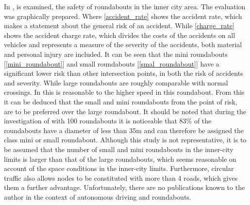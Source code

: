 In \cite{Baumert1998, brilon2002verkehrssicherheit, brilon2004uberprufung,voss1994verkehrssicherheit}, is examined, the safety of roundabouts in the inner city area.
The evaluation was graphically prepared. Where \cref{accident_rate} shows the accident rate, which makes a statement about the general risk of an accident.
While \cref{charge_rate} shows the accident charge rate, which divides the costs of the accidents on all vehicles and represents a measure of the severity of the accidents,
both material and personal injury are included. It can be seen that the mini roundabouts [\cref{mini_roundabout}] and small roundabouts [\cref{smal_roundabout}] have a significant 
lower risk than other intersection points, in both the risk of accidents and severity. While large roundabouts are roughly comparable with normal crossings. 
In \cite{Bondzio2012} this is reasonable to the higher speed in this roundabout. From this it can be deduced that the small and mini roundabouts from the point of risk,
are to be preferred over the large roundabout. It should be noted that during the investigation of \cite{Bondzio2012} with 100 roundabouts it is noticeable that 83\%
of the roundabouts have a diameter of less than 35m and can therefore be assigned the class mini or small roundabout.
Although this study is not representative, it is to be assumed that the number of small and mini roundabouts in the inner-city limits is larger than that of the large roundabouts,
which seems reasonable on account of the space conditions in the inner-city limits.
Furthermore, circular traffic also allows nodes to be constituted with more than 4 roads, which gives them a further advantage.
Unfortunately, there are no publications known to the author in the context of autonomous driving and roundabouts.






